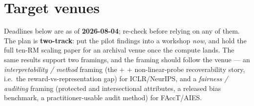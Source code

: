 \documentclass{article}
\begin{document}
\section{Target venues}
Deadlines below are as of \textbf{2026-08-04}; re-check before relying on any of them. The plan is
\textbf{two-track}: put the pilot findings into a workshop \emph{now}, and hold the full ten-RM scaling
paper for an archival venue once the compute lands. The same results support two framings, and the framing
should follow the venue --- an \emph{interpretability / method} framing (the \nullspace{} $+$ \leace{} $+$
non-linear-probe recoverability story, i.e.\ the reward-vs-representation gap) for ICLR/NeurIPS, and a
\emph{fairness / auditing} framing (protected and intersectional attributes, a released bias benchmark, a
practitioner-usable audit method) for FAccT/AIES.
\end{document}

